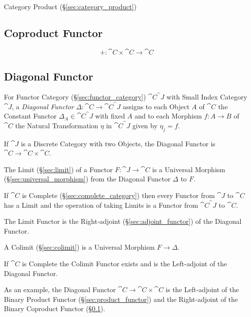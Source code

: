 Category Product (\S\ref{sec:category_product})



\subsection{Coproduct Functor}\label{sec:coproduct_functor}

\[
  + : \cat{C} \times \cat{C} \rightarrow \cat{C}
\]



\subsection{Diagonal Functor}\label{sec:diagonal_functor}

For Functor Category (\S\ref{sec:functor_category})
$\cat{C}^\cat{J}$ with Small Index Category $\cat{J}$, a
\emph{Diagonal Functor} $\Delta : \cat{C} \rightarrow
\cat{C}^\cat{J}$ assigns to each Object $A$ of $\cat{C}$ the
Constant Functor $\Delta_A \in \cat{C}^\cat{J}$ with fixed $A$
and to each Morphism $f : A \rightarrow B$ of $\cat{C}$ the Natural
Transformation $\eta$ in $\cat{C}^\cat{J}$ given by $\eta_j =
f$.

If $\cat{J}$ is a Discrete Category with two Objects, the Diagonal
Functor is $\cat{C} \rightarrow \cat{C} \times \cat{C}$.

The Limit (\S\ref{sec:limit}) of a Functor $F : \cat{J} \rightarrow
\cat{C}$ is a Universal Morphism (\S\ref{sec:universal_morphism})
from the Diagonal Functor $\Delta$ to $F$.

If $\cat{C}$ is Complete (\S\ref{sec:complete_category}) then every
Functor from $\cat{J}$ to $\cat{C}$ has a Limit and the
operation of taking Limits is a Functor from $\cat{C}^\cat{J}$
to $\cat{C}$.

The Limit Functor is the Right-adjoint (\S\ref{sec:adjoint_functor})
of the Diagonal Functor.

A Colimit (\S\ref{sec:colimit}) is a Universal Morphism $F \rightarrow
\Delta$.

If $\cat{C}$ is Complete the Colimit Functor exists and is the
Left-adjoint of the Diagonal Functor.

As an example, the Diagonal Functor $\cat{C} \rightarrow \cat{C}
\times \cat{C}$ is the Left-adjoint of the Binary Product Functor
(\S\ref{sec:product_functor}) and the Right-adjoint of the Binary
Coproduct Functor (\S\ref{sec:coproduct_functor}).



